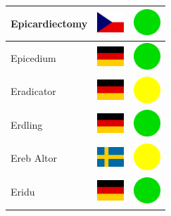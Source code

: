 \documentclass[12pt, a4paper, twoside]{report}
\begin{document}
\begin{center}
\begin{longtable}{|p{5cm}|p{2cm}|p{2cm}|}
Epicardiectomy & \includegraphics[width=1cm]{4x3/cz} & \includegraphics[width=1cm]{likes/y} \\ \hline
Epicedium & \includegraphics[width=1cm]{4x3/de} & \includegraphics[width=1cm]{likes/y} \\ \hline
Eradicator & \includegraphics[width=1cm]{4x3/de} & \includegraphics[width=1cm]{likes/m} \\ \hline
Erdling & \includegraphics[width=1cm]{4x3/de} & \includegraphics[width=1cm]{likes/y} \\ \hline
Ereb Altor & \includegraphics[width=1cm]{4x3/se} & \includegraphics[width=1cm]{likes/m} \\ \hline
Eridu & \includegraphics[width=1cm]{4x3/de} & \includegraphics[width=1cm]{likes/y} \\ \hline

\end{longtable}
\end{center}
\end{document}
